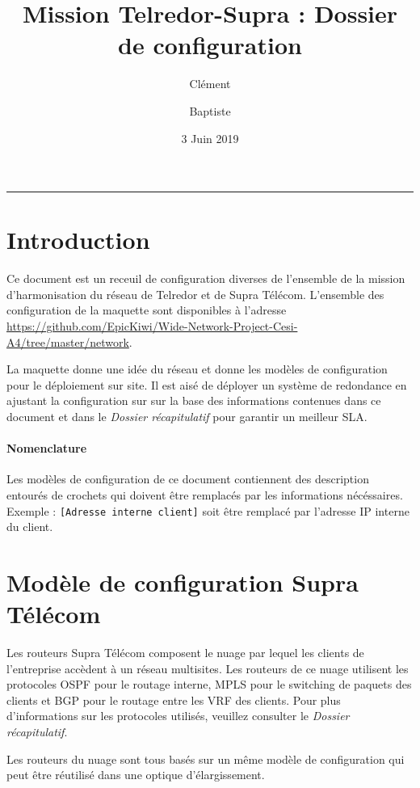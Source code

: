\documentclass{article}
\title{Mission Telredor-Supra : Dossier de configuration}
\date{3 Juin 2019}
\author{Clément \bsc{Boutin} \and Baptiste \bsc{Saclier}}
\newcommand{\tlr}{Telredor\xspace}
\newcommand{\spr}{Supra Télécom\xspace}
\begin{document}
\maketitle

\begin{center}
\rule{0.5\textwidth}{0.4pt}
\end{center}

\tableofcontents

\section{Introduction}

Ce document est un receuil de configuration diverses de l'ensemble de la mission d'harmonisation du réseau de \tlr et de \spr.
L'ensemble des configuration de la maquette sont disponibles à l'adresse \url{https://github.com/EpicKiwi/Wide-Network-Project-Cesi-A4/tree/master/network}.

\medskip

La maquette donne une idée du réseau et donne les modèles de configuration pour le déploiement sur site.
Il est aisé de déployer un système de redondance en ajustant la configuration sur sur la base des informations contenues dans ce document et dans le \emph{Dossier récapitulatif} pour garantir un meilleur SLA.

\paragraph{Nomenclature} Les modèles de configuration de ce document contiennent des description entourés de crochets qui doivent être remplacés par les informations nécéssaires.
Exemple : \texttt{\color{PineGreen}[Adresse interne client]} soit être remplacé par l'adresse IP interne du client.

\section{Modèle de configuration \spr}

Les routeurs \spr composent le nuage par lequel les clients de l'entreprise accèdent à un réseau multisites.
Les routeurs de ce nuage utilisent les protocoles OSPF pour le routage interne, MPLS pour le switching de paquets des clients et BGP pour le routage entre les VRF des clients.
Pour plus d'informations sur les protocoles utilisés, veuillez consulter le \emph{Dossier récapitulatif}.

Les routeurs du nuage sont tous basés sur un même modèle de configuration qui peut être réutilisé dans une optique d'élargissement.
\end{document}
